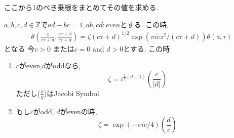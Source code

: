 ここから1のべき乗根をまとめてその値を求める.
\begin{thm}
$a,b,c,d \in \mathbb{Z}$で$ad -bc=1,ab, cd:even$とする.
この時,
\begin{align*}
 \theta(\frac{z}{c\tau + d}, \frac{a \tau + b}{c \tau +d}) =  \zeta
 \left(c\tau + d \right)^{1/2}
 \exp(\pi i c z^2/(c\tau + d))  \theta(z, \tau)
 \tag{F1}
\end{align*}
となる
今$c > 0$ または$c=0$ and $d>0$とする.
この時
\begin{enumerate}
    \item $c$がeven,$d$がoddなら,
    \begin{equation*}
     \zeta = i^{\frac{1}{2}(d-1)}  \left(\frac{c}{|d|} \right)
    \end{equation*}
    ただし($\frac{x}{y}$)はJacobi Symbol
\item もし$c$がodd, $d$がevenの時,
\begin{equation*}
 \zeta = \exp(-\pi i c /4)  \left(\frac{d}{c} \right)
\end{equation*}
\end{enumerate}

\end{thm}
